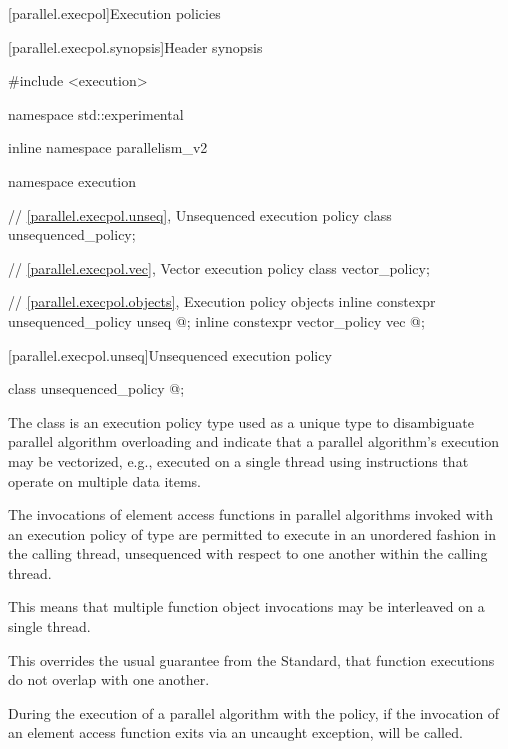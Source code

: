 
[parallel.execpol]{Execution policies}

[parallel.execpol.synopsis]{Header  synopsis}

\begin{codeblock}
#include <execution>

namespace std::experimental {
inline namespace parallelism_v2 {
namespace execution {
  // \ref{parallel.execpol.unseq}, Unsequenced execution policy
  class unsequenced_policy;

  // \ref{parallel.execpol.vec}, Vector execution policy
  class vector_policy;

  // \ref{parallel.execpol.objects}, Execution policy objects
  inline constexpr unsequenced_policy unseq{ @\unspec@ };
  inline constexpr vector_policy vec{ @\unspec@ };
}
}
}
\end{codeblock}

[parallel.execpol.unseq]{Unsequenced execution policy}

\begin{codeblock}
class unsequenced_policy { @\unspec@ };
\end{codeblock}

\pnum
The class  is an execution policy type used as
a unique type to disambiguate parallel algorithm overloading and indicate that
a parallel algorithm's execution may be vectorized, e.g., executed on a single
thread using instructions that operate on multiple data items.

\pnum
The invocations of element access functions in parallel algorithms
invoked with an execution policy of type  are
permitted to execute in an unordered fashion in the calling thread, unsequenced
with respect to one another within the calling thread. \begin{note}This means
that multiple function object invocations may be interleaved on a single
thread.\end{note}

\pnum
\begin{note}
  This overrides the usual guarantee from the \Cpp Standard,  that function executions do not overlap with one another.
\end{note}

\pnum
During the execution of a parallel algorithm with the  policy, if the invocation of an element access function exits via an uncaught exception,  will be called.

